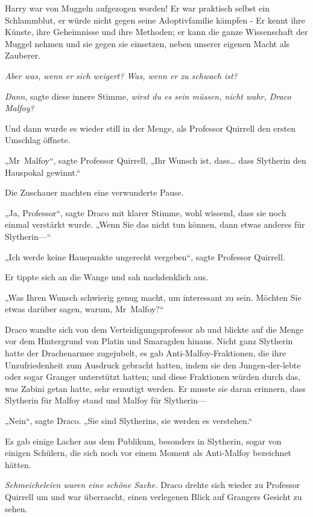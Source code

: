 {Harry war von Muggeln aufgezogen worden! Er war praktisch selbst ein Schlammblut, er würde nicht gegen seine Adoptivfamilie kämpfen - Er kennt ihre Künste, ihre Geheimnisse und ihre Methoden; er kann die ganze Wissenschaft der Muggel nehmen und sie gegen sie einsetzen, neben unserer eigenen Macht als Zauberer.

\emph{Aber was, wenn er sich weigert? Was, wenn er zu schwach ist?}

\emph{Dann}, sagte diese innere Stimme, \emph{wirst du es sein müssen, nicht wahr, Draco Malfoy?}

Und dann wurde es wieder still in der Menge, als Professor Quirrell den ersten Umschlag öffnete.

„Mr~Malfoy“, sagte Professor Quirrell, „Ihr Wunsch ist, dass… dass Slytherin den Hauspokal gewinnt.“

Die Zuschauer machten eine verwunderte Pause.

„Ja, Professor“, sagte Draco mit klarer Stimme, wohl wissend, dass sie noch einmal verstärkt wurde. „Wenn Sie das nicht tun können, dann etwas anderes für Slytherin—“

„Ich werde keine Hauspunkte ungerecht vergeben“, sagte Professor Quirrell.

Er tippte sich an die Wange und sah nachdenklich aus.

„Was Ihren Wunsch schwierig genug macht, um interessant zu sein. Möchten Sie etwas darüber sagen, warum, Mr~Malfoy?“

Draco wandte sich von dem Verteidigungsprofessor ab und blickte auf die Menge vor dem Hintergrund von Platin und Smaragden hinaus. Nicht ganz Slytherin hatte der Drachenarmee zugejubelt, es gab Anti-Malfoy-Fraktionen, die ihre Unzufriedenheit zum Ausdruck gebracht hatten, indem sie den Jungen-der-lebte oder sogar Granger unterstützt hatten; und diese Fraktionen würden durch das, was Zabini getan hatte, sehr ermutigt werden. Er musste sie daran erinnern, dass Slytherin für Malfoy stand und Malfoy für Slytherin—

„Nein“, sagte Draco. „Sie sind Slytherins, sie werden es verstehen.“

Es gab einige Lacher aus dem Publikum, besonders in Slytherin, sogar von einigen Schülern, die sich noch vor einem Moment als Anti-Malfoy bezeichnet hätten.

\emph{Schmeicheleien waren eine schöne Sache.} Draco drehte sich wieder zu Professor Quirrell um und war überrascht, einen verlegenen Blick auf Grangers Gesicht zu sehen.

}
